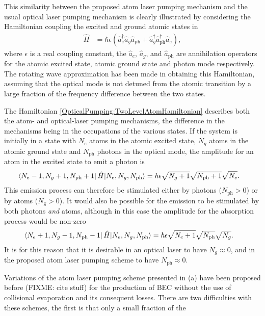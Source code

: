 This similarity between the proposed atom laser pumping mechanism and the usual optical laser pumping mechanism is clearly illustrated by considering the Hamiltonian coupling the excited and ground atomic states in 
\begin{align}
    \hat{H} &= \hbar \epsilon \left(\hat{a}_e^\dagger \hat{a}_g \hat{a}_\text{ph} + \hat{a}_g^\dagger \hat{a}_\text{ph}^\dagger \hat{a}_e  \right),
    \label{OpticalPumping:TwoLevelAtomHamiltonian}
\end{align}
where $\epsilon$ is a real coupling constant, the $\hat{a}_e$, $\hat{a}_g$, and $\hat{a}_\text{ph}$ are annihilation operators for the atomic excited state, atomic ground state and photon mode respectively.  The rotating wave approximation has been made in obtaining this Hamiltonian, assuming that the optical mode is not detuned from the atomic transition by a large fraction of the frequency difference between the two states.  

The Hamiltonian \eqref{OpticalPumping:TwoLevelAtomHamiltonian} describes both the atom- and optical-laser pumping mechanisms, the difference in the mechanisms being in the occupations of the various states.  If the system is initially in a state with $N_e$ atoms in the atomic excited state, $N_g$ atoms in the atomic ground state and $N_\text{ph}$ photons in the optical mode, the amplitude for an atom in the excited state to emit a photon is
\begin{align}
    \left<N_e-1, N_g + 1, N_\text{ph} + 1\right| \hat{H} {\left|N_e, N_g, N_\text{ph}\right>} &= \hbar \epsilon \sqrt{N_g+1} \sqrt{N_\text{ph}+1} \sqrt{N_e}.
\end{align}
This emission process can therefore be stimulated either by photons ($N_\text{ph} > 0$) or by atoms ($N_\text{g} > 0$).  It would also be possible for the emission to be stimulated by both photons \emph{and} atoms, although in this case the amplitude for the absorption process would be non-zero
\begin{align}
    \left<N_e+1, N_g - 1, N_\text{ph} - 1\right| \hat{H} {\left|N_e, N_g, N_\text{ph}\right>} &= \hbar \epsilon \sqrt{N_e+1} \sqrt{N_\text{ph}} \sqrt{N_g}.
\end{align}
It is for this reason that it is desirable in an optical laser to have $N_g \approx 0$, and in the proposed atom laser pumping scheme to have $N_\text{ph} \approx 0$.

Variations of the atom laser pumping scheme presented in (a) have been proposed before (FIXME: cite stuff) for the production of BEC without the use of collisional evaporation and its consequent losses.  There are two difficulties with these schemes, the first is that only a small fraction of the 





